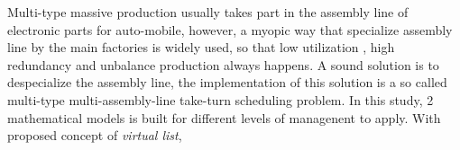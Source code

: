 Multi-type massive production usually takes part in the assembly line of electronic parts for auto-mobile, however, a myopic way that specialize assembly line by the main factories is widely used, so that low utilization , high redundancy and unbalance production always happens. A sound solution is to despecialize the assembly line, the implementation of this solution is a so called multi-type multi-assembly-line take-turn scheduling problem. In this study, 2 mathematical models is built for different levels of managenent to apply. With proposed concept of \textit{virtual list}, 


